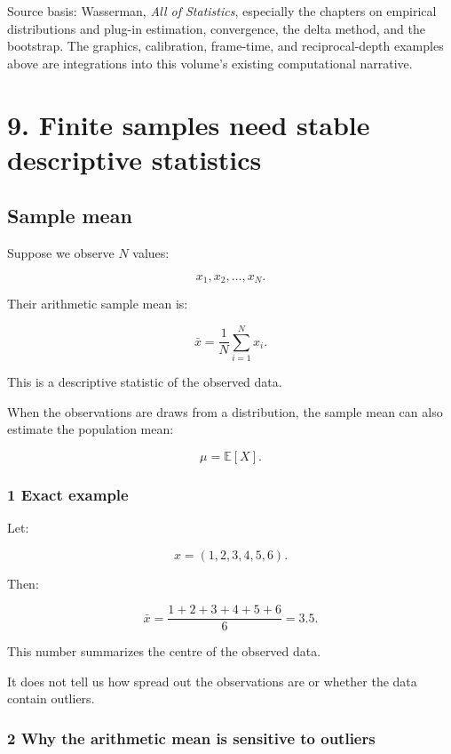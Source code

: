 Source basis: Wasserman, \emph{All of Statistics}, especially the chapters on empirical distributions and plug-in estimation, convergence, the delta method, and the bootstrap. The graphics, calibration, frame-time, and reciprocal-depth examples above are integrations into this volume's existing computational narrative.

\section{9. Finite samples need stable descriptive statistics}\label{02-foundations-ii-ch030-finite-samples-need-stable-descriptive-statistics}

\subsection{Sample mean}\label{02-foundations-ii-ch030-sample-mean}

Suppose we observe \(N\) values:

\[
 x_1,x_2,\ldots,x_N.
\]

Their arithmetic sample mean is:

\[
 \boxed{ \bar x=\frac1N\sum_{i=1}^{N}x_i }.
\]

This is a descriptive statistic of the observed data.

When the observations are draws from a distribution, the sample mean can also estimate the population mean:

\[
 \mu=\mathbb E[X].
\]

\subsubsection{1 Exact example}\label{02-foundations-ii-ch030-exact-example}

Let:

\[
 x=(1,2,3,4,5,6).
\]

Then:

\[
 \bar x= \frac{1+2+3+4+5+6}{6} =\boxed{3.5}.
\]

This number summarizes the centre of the observed data.

It does not tell us how spread out the observations are or whether the data contain outliers.

\subsubsection{2 Why the arithmetic mean is sensitive to outliers}\label{02-foundations-ii-ch030-why-the-arithmetic-mean-is-sensitive-to-outliers}

